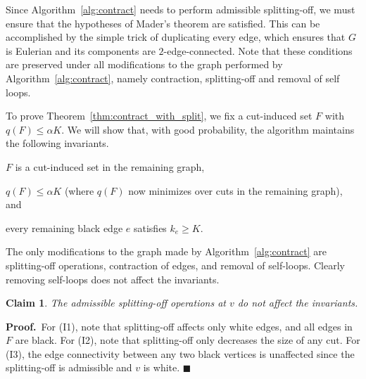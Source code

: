 \documentclass[11pt]{article}
\newcommand{\proofbelow}{8pt}
\numberwithin{equation}{section}
\newtheorem{claim}[theorem]{Claim}
\renewenvironment{proof}{\noindent\textbf{Proof.}\,}{\afterproof}
\newcommand{\afterproof}{\hfill $\blacksquare$ \par \vspace{\proofbelow}}
\newcommand{\Algorithm}[1]{Algorithm~\ref{alg:#1}}
\newcommand{\ClaimName}[1]{\label{clm:#1}}
\newcommand{\Theorem}[1]{Theorem~\ref{thm:#1}}
\begin{document}
Since \Algorithm{contract} needs to perform admissible splitting-off,
we must ensure that the hypotheses of Mader's theorem are satisfied.
This can be accomplished by the simple trick of duplicating every edge,
which ensures that $G$ is Eulerian and its components are $2$-edge-connected.
Note that these conditions are preserved under
all modifications to the graph performed by \Algorithm{contract},
namely contraction, splitting-off and removal of self loops.


\newenvironment{invariants}{
    \begin{list}{(I\textrm{\arabic{itemctr}}): }{
        \usecounter{itemctr}
        \setlength{\itemindent}{0pt}
        \setlength{\labelwidth}{24pt}
        \setlength{\labelsep}{9pt}
        \setlength{\leftmargin}{\parindent+\labelwidth+\labelsep}
        \setlength{\itemsep}{3pt}
        \setlength{\topsep}{6pt}
        \setlength{\listparindent}{0pt}
    }
}
{
    \end{list}
}

To prove \Theorem{contract_with_split},
we fix a cut-induced set $F$ with $q(F) \leq \alpha K$.
We will show that, with good probability,
the algorithm maintains the following invariants.
\begin{invariants}
\item $F$ is a cut-induced set in the remaining graph,
\item $q(F) \leq \alpha K$ (where $q(F)$ now minimizes over cuts in the remaining graph), and
\item every remaining black edge $e$ satisfies $k_e \geq K$.
\end{invariants}

The only modifications to the graph made by \Algorithm{contract}
are splitting-off operations, contraction of edges, and removal of self-loops.
Clearly removing self-loops does not affect the invariants.

\begin{claim}
\ClaimName{splitoff}
The admissible splitting-off operations at $v$ do not affect the invariants.
\end{claim}
\begin{proof}
For (I1), note that splitting-off affects only white edges, and all edges in $F$ are black.
For (I2), note that splitting-off only decreases the size of any cut.
For (I3), the edge connectivity between any two black vertices is unaffected
since the splitting-off is admissible and $v$ is white.
\end{proof}
\end{document}
